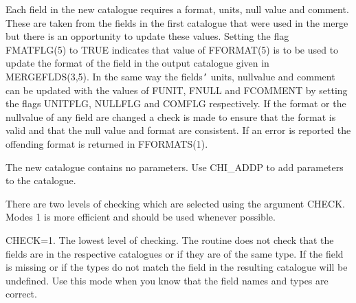 \begin{small}
{{      Each field in the new catalogue requires a format, units, null value and
      comment. These are taken from the fields in the first catalogue that were
      used in the merge but there is an opportunity to update these values.
      Setting the flag  FMATFLG(5) to TRUE indicates that value of FFORMAT(5)
      is to  be used to update the format of the field in the output catalogue
      given in MERGEFLDS(3,5). In the same way the fields{\tt '} units, nullvalue and
      comment can be updated with the values of FUNIT, FNULL and
      FCOMMENT by setting the flags UNITFLG, NULLFLG and COMFLG
      respectively. If the format or the nullvalue of any field are changed
      a check is made to ensure that the format is valid and that the null
      value and format are consistent. If an error is reported the offending
      format is returned in FFORMATS(1).

      The new catalogue contains no parameters. Use CHI\_ADDP
      to add parameters to the catalogue.

      There are two levels of checking which are selected using the argument
      CHECK. Modes 1 is more efficient and should be used whenever possible.

      CHECK=1. The lowest level of checking. The routine does not check that
      the fields are in the respective catalogues or if they are of the same
      type. If the field is missing or if the types do not match the field
      in the resulting catalogue will be undefined. Use this mode when you
      know that the field names and types are correct.

}}
\end{small}
